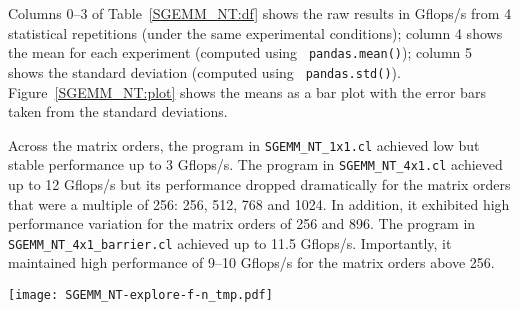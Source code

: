 \documentclass{acm_proc_article-sp} %
\begin{document}
Columns 0--3 of Table~\ref{SGEMM_NT:df} shows the raw results in
Gflops/s from 4 statistical repetitions (under the same experimental
conditions); column 4 shows the mean for each experiment (computed using {\tt
pandas.mean()}); column 5 shows the standard deviation (computed using {\tt
pandas.std()}).
%
Figure~\ref{SGEMM_NT:plot} shows the means as a bar plot with the error bars
taken from the standard deviations.

Across the matrix orders, the program in \verb|SGEMM_NT_1x1.cl| achieved
low but stable performance up to 3 Gflops/s.
%
The program in \verb|SGEMM_NT_4x1.cl| achieved up to 12 Gflops/s but its
performance dropped dramatically for the matrix orders that were a multiple of
256: 256, 512, 768 and 1024.
%
In addition, it exhibited high performance variation for the matrix orders of
256 and 896.
%
The program in \verb|SGEMM_NT_4x1_barrier.cl| achieved up to 11.5
Gflops/s. Importantly, it maintained high performance of 9--10 Gflops/s
for the matrix orders above 256.


\begin{table*}
  \centering
  \caption{\label{SGEMM_NT:df}The performance of 3 SGEMM NT kernels: {\tt pandas} DataFrame with raw results.}
  
\end{table*}

\begin{figure*}
  \texttt{[image: SGEMM\_NT-explore-f-n\_tmp.pdf]}
  \caption{The performance of 3 SGEMM NT kernels: {\tt matplotlib} bar plot with error bars.}
  \label{SGEMM_NT:plot}
\end{figure*}


%

\end{document}
